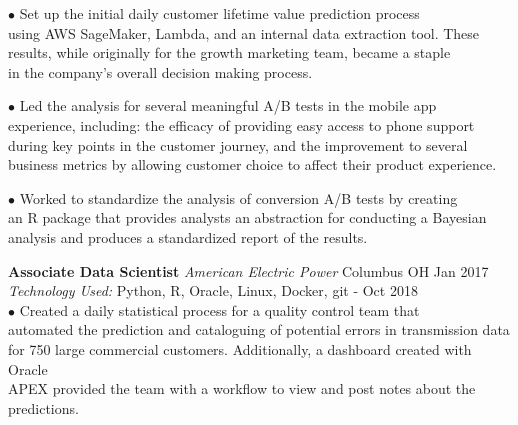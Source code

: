 \documentclass[12pt]{article}
\newcommand\tab[1][1cm]{\hspace*{#1}}
\begin{document}
\begin{flushleft}
    \tab $\bullet$ Set up the initial daily customer lifetime value prediction process \\
    \tab[1.25cm] using AWS SageMaker, Lambda, and an internal data extraction tool. These \\
    \tab[1.25cm] results, while originally for the growth marketing team, became a staple \\
    \tab[1.25cm] in the company's overall decision making process.
    \vspace*{0.5mm}

    \tab $\bullet$ Led the analysis for several meaningful A/B tests in the mobile app \\
    \tab[1.25cm] experience, including: the efficacy of providing easy access to phone support \\
    \tab[1.25cm] during key points in the customer journey, and the improvement to several \\
    \tab[1.25cm] business metrics by allowing customer choice to affect their product experience. \\
    \vspace*{0.5mm}

    \tab $\bullet$ Worked to standardize the analysis of conversion A/B tests by creating \\
    \tab[1.25cm] an R package that provides analysts an abstraction for conducting a Bayesian \\
    \tab[1.25cm] analysis and produces a standardized report of the results. \\
    \medskip

    \textbf{Associate Data Scientist} \tab[.25cm] \textit{American Electric Power} \tab[.15cm] \small{Columbus OH} \hfill {Jan 2017} \\
    \tab[0.5cm] \textit{Technology Used:} Python, R, Oracle, Linux, Docker, git \hfill \small{{-} Oct 2018} \\

    \tab $\bullet$ Created a daily statistical process for a quality control team that \\
    \tab[1.25cm] automated the prediction and cataloguing of potential errors in transmission data \\
    \tab[1.25cm] for 750 large commercial customers. Additionally, a dashboard created with Oracle \\
    \tab[1.25cm] APEX provided the team with a workflow to view and post notes about the predictions. \\
    \vspace*{0.5mm}


\end{flushleft}
\end{document}
